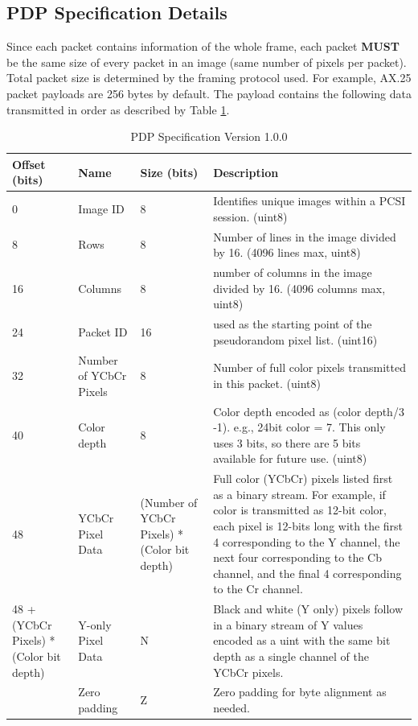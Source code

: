 \documentclass[letterpaper]{article}
\begin{document}
\subsection{PDP Specification Details}\label{section:PDPspec}
Since each packet contains information of the whole frame, each packet \textbf{MUST} be the same size of every packet in an image (same number of pixels per packet). Total packet size is determined by the framing protocol used. For example, AX.25 packet payloads are 256 bytes by default. The payload contains the following data transmitted in order as described by Table \ref{table:PDPSpec}.





\begin{table}[tbp]
    \centering
\begin{tabularx}{\textwidth}{ |p{1.5cm}|p{1.5cm}|p{1.5cm}|X| } 
 \hline
 \textbf{Offset (bits)} & \textbf{Name} & \textbf{Size (bits)}  & \textbf{Description} \\ \hline\hline
 0 & Image ID & 8 & Identifies unique images within a PCSI session. (uint8)\\ \hline
 8 & Rows & 8 & Number of lines in the image divided by 16. (4096 lines max, uint8) \\ \hline
 16 & Columns & 8 & number of columns in the image divided by 16. (4096 columns max, uint8) \\ \hline
 24 & Packet ID & 16 & used as the starting point of the pseudorandom pixel list. (uint16) \\ \hline
 32 & Number of YCbCr Pixels & 8 & Number of full color pixels transmitted in this packet. (uint8)\\ \hline
 40 & Color depth & 8 & Color depth encoded as (color depth/3 -1). e.g., 24bit color = 7. This only uses 3 bits, so there are 5 bits available for future use. (uint8) \\ \hline
 48 & YCbCr Pixel Data & (Number of YCbCr Pixels) * (Color bit depth) & Full color (YCbCr) pixels listed first as a binary stream. For example, if color is transmitted as 12-bit color, each pixel is 12-bits long with the first 4 corresponding to the Y channel, the next four corresponding to the Cb channel, and the final 4 corresponding to the Cr channel. \\ \hline
 48 + (YCbCr Pixels) * (Color bit depth) & Y-only Pixel Data & N & Black and white (Y only) pixels follow in a binary stream of Y values encoded as a uint with the same bit depth as a single channel of the YCbCr pixels. \\ \hline
  & Zero padding & Z & Zero padding for byte alignment as needed. \\
 \hline
\end{tabularx}
\caption{PDP Specification Version 1.0.0}
\label{table:PDPSpec}
\end{table}
\end{document}
